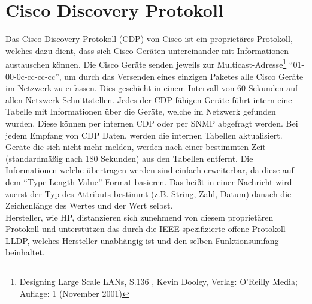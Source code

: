 \section{Cisco Discovery Protokoll}
\label{sec:cdp}

Das Cisco Discovery Protokoll (CDP) von Cisco ist ein proprietäres Protokoll, welches dazu dient, dass sich Cisco-Geräten untereinander mit Informationen austauschen können.
Die Cisco Geräte senden jeweils zur Multicast-Adresse\footnote{Designing Large Scale LANs, S.136 , Kevin Dooley, Verlag: O'Reilly Media; Auflage: 1 (November 2001)} “01-00-0c-cc-cc-cc”, um durch das Versenden eines einzigen Paketes alle Cisco Geräte im Netzwerk zu erfassen.
Dies geschieht in einem Intervall von 60 Sekunden auf allen Netzwerk-Schnittstellen.
Jedes der CDP-fähigen Geräte führt intern eine Tabelle mit Informationen über die Geräte, welche im Netzwerk gefunden wurden.
Diese können per internen CDP oder per SNMP abgefragt werden.
Bei jedem Empfang von CDP Daten, werden die internen Tabellen aktualisiert.
Geräte die sich nicht mehr melden, werden nach einer bestimmten Zeit (standardmäßig nach 180 Sekunden) aus den Tabellen entfernt.
Die Informationen welche übertragen werden sind einfach erweiterbar, da diese auf dem “Type-Length-Value” Format basieren.
Das heißt in einer Nachricht wird zuerst der Typ des Attributs bestimmt (z.B. String, Zahl, Datum) danach die Zeichenlänge des Wertes und der Wert selbst.\\
Hersteller, wie HP, distanzieren sich zunehmend von diesem proprietären Protokoll und unterstützen das durch die IEEE spezifizierte offene Protokoll LLDP, welches Hersteller unabhängig ist und den selben Funktionsumfang beinhaltet.